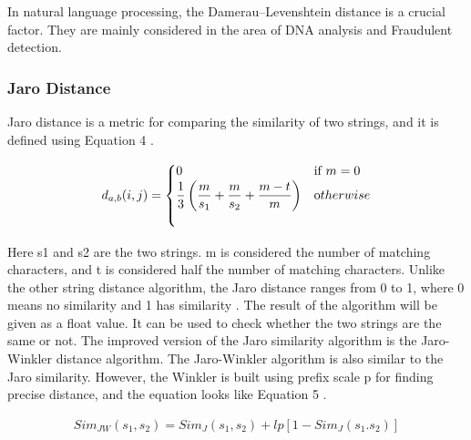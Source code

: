 In natural language processing, the Damerau–Levenshtein distance is a crucial factor. They are mainly considered in the area of DNA analysis and Fraudulent detection.
\subsubsection{Jaro Distance}
Jaro distance is a metric for comparing the similarity of two strings, and it is defined using Equation 4 \cite{JaroWinkler}.

\begin{equation}
	\begin{aligned}
		\label{eq:jaro}	
		d_{a,b}(i,j) = 
		\begin{cases}
			0 & \text {if } m = 0\\
			\dfrac{1}{3}\left( \dfrac{m}{s_1} + \dfrac{m}{s_2} + \dfrac{m - t}{m} \right) & \text otherwise\\
			\
		\end{cases}
	\end{aligned}
\end{equation}

Here s1 and s2 are the two strings. m is considered the number of matching characters, and t is considered half the number of matching characters. Unlike the other string distance algorithm, the Jaro distance ranges from 0 to 1, where 0 means no similarity and 1 has similarity \cite{Ak2021}. The result of the algorithm will be given as a float value. It can be used to check whether the two strings are the same or not. 
The improved version of the Jaro similarity algorithm is the Jaro-Winkler distance algorithm. The Jaro-Winkler algorithm is also similar to the Jaro similarity. However, the Winkler is built using prefix scale p for finding precise distance, and the equation looks like Equation 5 \cite{Stat2021}.

\begin{equation}
	\begin{aligned}
		\label{eq:jarowinkler}	
		Sim_{JW}(s_1, s_2) = Sim_J(s_1,s_2) + lp[1 - Sim_J(s_1.s_2)]
	\end{aligned}
\end{equation}
